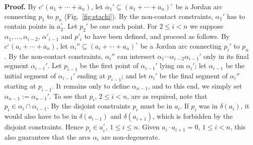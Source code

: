 \documentclass{article}
\newcommand{\ic}{c^\circ}
\newcommand{\ti}[2][]{{#2}^{\circ_{#1}}}
\newcommand{\qedsymbol}{\ding{113}}
\newenvironment{proof}{\par\noindent\textbf{Proof.}}{\mbox{}\hfill\qedsymbol\par\bigskip}
\begin{document}
\begin{proof}
	By $\ic(a_1+\cdots+a_n)$, let $\alpha_1'\subseteq
        \ti{(a_1+\cdots+a_n)}$ be a Jordan arc connecting $p_1$ to
        $p_n$ (Fig.~\ref{fig:stacki}). By the non-contact constraints,
        $\alpha_1'$ has to contain points in $\ti a_2$. Let $p_2'$ be
        one such point.  For $2\leq i<n$ we suppose $\alpha_1, \ldots,
        \alpha_{i-2}$, $\alpha'_{i-1}$ and $p'_i$ to have been
        defined, and proceed as follows. By $\ic(a_i+\cdots+a_n)$, let
        $\alpha_i''\subseteq \ti{(a_i+\cdots+a_n)}$ be a Jordan arc
        connecting $p_i'$ to $p_n$. By the non-contact constraints,
        $\alpha_i''$ can intersect
        $\alpha_1\cdots\alpha_{i-2}\alpha_{i-1}'$ only in its final
        segment $\alpha_{i-1}'$. Let $p_{i-1}$ be the first point of
        $\alpha_{i-1}'$ lying on $\alpha_i'$; let $\alpha_{i-1}$ be
        the initial segment of $\alpha_{i-1}'$ ending at $p_{i-1}$;
        and let $\alpha_i'$ be the final segment of $\alpha_i''$
        starting at $p_{i-1}$. It remains only to define
        $\alpha_{n-1}$, and to this end, we simply set
        $\alpha_{n-1}:=\alpha_{n-1}'$. To see that $p_i$, $2\leq i<n$,
        are as required, note that $p_i\in
        \alpha_i\cap\alpha_{i-1}$. By the disjoint constraints $p_i$
        must be in $a_i$. If $p_i$ was in $\delta(a_i)$, it would also
        have to be in $\delta(a_{i-1})$ and $\delta(a_{i+1})$, which
        is forbidden by the disjoint constraints. Hence $p_i\in\ti
        a_i$, $1\leq i\leq n$. Given $a_i\cdot a_{i+1}=0$, $1\leq
        i<n$, this also guarantees that the arcs $\alpha_i$ are
        non-degenerate.
\end{proof}
\end{document}
